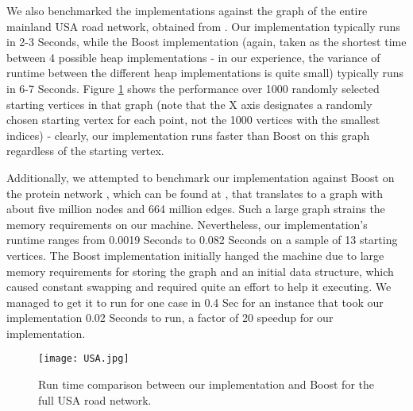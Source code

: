 \documentclass[conference,10pt,twocolumn]{IEEEtran}
\begin{document}
We also benchmarked the implementations against the graph of the entire mainland USA road network, obtained from \cite{challenge9}. Our implementation typically runs in 2-3 Seconds, while the Boost implementation (again, taken as the shortest time between 4 possible heap implementations - in our experience, the variance of runtime between the different heap implementations is quite small) typically runs in 6-7 Seconds. Figure \ref{fig:usa} shows the performance over 1000 randomly selected starting vertices in that graph (note that the X axis designates a randomly chosen starting vertex for each point, not the 1000 vertices with the smallest indices) - clearly, our implementation runs faster than Boost on this graph regardless of the starting vertex.

Additionally, we attempted to benchmark our implementation against Boost on the protein network \cite{string-paper}, which can be found at \cite{string}, that translates to a graph with about five million nodes and 664 million edges. 
Such a large graph strains the memory requirements on our machine. Nevertheless, our implementation's runtime ranges from 0.0019 Seconds to 0.082 Seconds on a sample of 13 starting vertices.  
The Boost implementation initially hanged the machine due to large memory requirements for storing the graph and an initial data structure, which caused constant swapping and required quite an effort to help it executing.  We managed to get it to run for one case in 0.4 Sec for an instance that took our implementation 0.02 Seconds to run, a factor of 20 speedup for our implementation.  

\begin{figure}[ht!]
\begin{center}
\texttt{[image: USA.jpg]}
\caption{Run time comparison between our implementation and Boost for the full USA road network. }
\label{fig:usa}
\end{center}
\end{figure}
\end{document}
